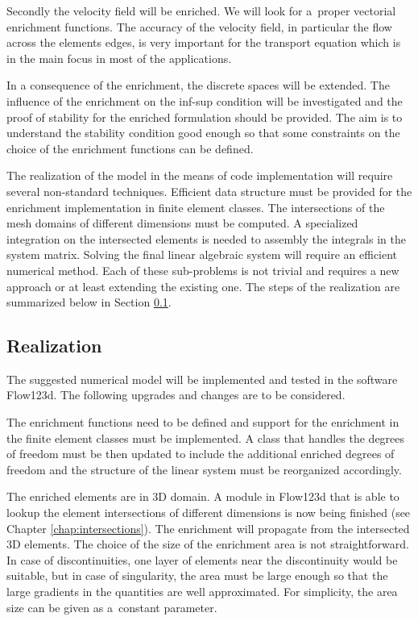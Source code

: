 Secondly the velocity field will be enriched. We will look for a~proper vectorial enrichment functions.
The accuracy of the velocity field, in particular the flow across the elements edges, is very important for
the transport equation which is in the main focus in most of the applications.

In a consequence of the enrichment, the discrete spaces will be extended. The influence of the enrichment on the inf-sup 
condition will be investigated and the proof of stability for the enriched formulation should be provided.
The aim is to understand the stability condition good enough so that some constraints on the choice of the enrichment 
functions can be defined. 

The realization of the model in the means of code implementation will require several non-standard techniques.
Efficient data structure must be provided for the enrichment implementation in finite element classes.
The intersections of the mesh domains of different dimensions must be computed. A specialized integration
on the intersected elements is needed to assembly the integrals in the system matrix. 
Solving the final linear algebraic system will require an efficient numerical method.
Each of these sub-problems is not trivial and requires a new approach or at least extending the existing one.
The steps of the realization are summarized below in Section \ref{sec:realization}.

\subsection{Realization} \label{sec:realization}
The suggested numerical model will be implemented and tested in the software Flow123d.
The following upgrades and changes are to be considered.

The enrichment functions need to be defined and support for the enrichment in the finite element classes must be implemented. 
A class that handles the degrees of freedom must be then updated to include the additional enriched degrees of freedom
and the structure of the linear system must be reorganized accordingly.

The enriched elements are in 3D domain. A module in Flow123d that is able to lookup the element intersections
of different dimensions is now being finished (see Chapter \ref{chap:intersections}). The enrichment will propagate from the intersected 3D elements.
The choice of the size of the enrichment area is not straightforward. In case of discontinuities, one layer of elements
near the discontinuity would be suitable, but in case of singularity, the area must be large enough so that 
the large gradients in the quantities are well approximated. For simplicity, the area size can be given as
a~constant parameter.

